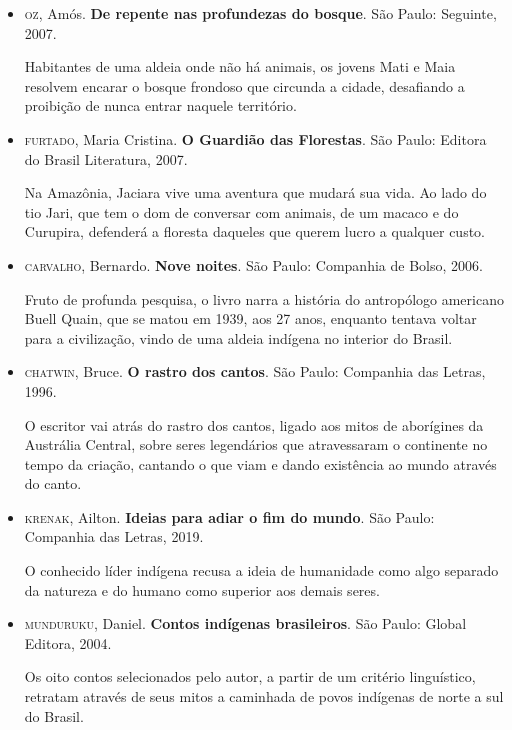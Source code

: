 \documentclass[12pt]{extarticle}
\begin{document}
\begin{itemize}
\item\textsc{oz}, Amós. \textbf{De repente nas profundezas do bosque}. São Paulo:
Seguinte, 2007.

Habitantes de uma aldeia onde não há animais, os jovens Mati e Maia
resolvem encarar o bosque frondoso que circunda a cidade, desafiando a
proibição de nunca entrar naquele território.

\item\textsc{furtado}, Maria Cristina. \textbf{O Guardião das Florestas}. São Paulo:
Editora do Brasil Literatura, 2007.

Na Amazônia, Jaciara vive uma aventura que mudará sua vida. Ao lado do
tio Jari, que tem o dom de conversar com animais, de um macaco e do
Curupira, defenderá a floresta daqueles que querem lucro a qualquer
custo.

\item\textsc{carvalho}, Bernardo. \textbf{Nove noites}. São Paulo: Companhia de Bolso, 2006.

Fruto de profunda pesquisa, o livro narra a história do antropólogo
americano Buell Quain, que se matou em 1939, aos 27 anos, enquanto
tentava voltar para a civilização, vindo de uma aldeia indígena no
interior do Brasil.

\item\textsc{chatwin}, Bruce. \textbf{O rastro dos cantos}. São Paulo: Companhia das
Letras, 1996.

O escritor vai atrás do rastro dos cantos, ligado aos mitos de
aborígines da Austrália Central, sobre seres legendários que
atravessaram o continente no tempo da criação, cantando o que viam e
dando existência ao mundo através do canto.

\item\textsc{krenak}, Ailton. \textbf{Ideias para adiar o fim do mundo}. São Paulo:
Companhia das Letras, 2019.

O conhecido líder indígena recusa a ideia de humanidade como algo
separado da natureza e do humano como superior aos demais seres.

\item\textsc{munduruku}, Daniel. \textbf{Contos indígenas brasileiros}. São Paulo:
Global Editora, 2004.

Os oito contos selecionados pelo autor, a partir de um critério
linguístico, retratam através de seus mitos a caminhada de povos
indígenas de norte a sul do Brasil.
\end{itemize}
\end{document}
